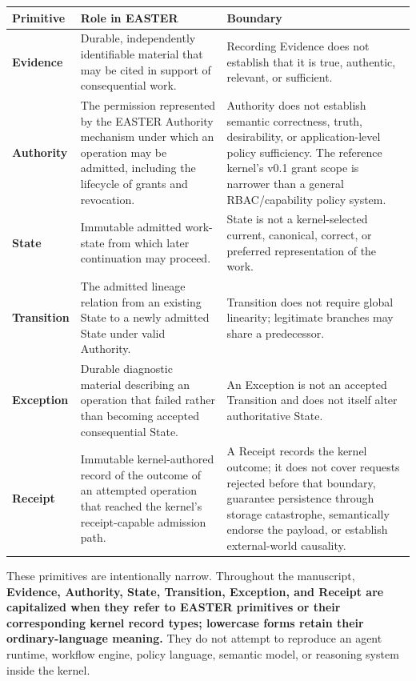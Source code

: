 \documentclass[11pt]{article}
\begin{document}
\begin{table}[htbp]
\centering
\small
\begin{tabularx}{\textwidth}{X X X}
\toprule
Primitive & Role in EASTER & Boundary \\
\midrule
\textbf{Evidence} & Durable, independently identifiable material that may be cited in support of consequential work. & Recording Evidence does not establish that it is true, authentic, relevant, or sufficient. \\
\textbf{Authority} & The permission represented by the EASTER Authority mechanism under which an operation may be admitted, including the lifecycle of grants and revocation. & Authority does not establish semantic correctness, truth, desirability, or application-level policy sufficiency. The reference kernel's v0.1 grant scope is narrower than a general RBAC/capability policy system. \\
\textbf{State} & Immutable admitted work-state from which later continuation may proceed. & State is not a kernel-selected current, canonical, correct, or preferred representation of the work. \\
\textbf{Transition} & The admitted lineage relation from an existing State to a newly admitted State under valid Authority. & Transition does not require global linearity; legitimate branches may share a predecessor. \\
\textbf{Exception} & Durable diagnostic material describing an operation that failed rather than becoming accepted consequential State. & An Exception is not an accepted Transition and does not itself alter authoritative State. \\
\textbf{Receipt} & Immutable kernel-authored record of the outcome of an attempted operation that reached the kernel's receipt-capable admission path. & A Receipt records the kernel outcome; it does not cover requests rejected before that boundary, guarantee persistence through storage catastrophe, semantically endorse the payload, or establish external-world causality. \\
\bottomrule
\end{tabularx}
\end{table}


These primitives are intentionally narrow. Throughout the manuscript, \textbf{Evidence, Authority, State, Transition, Exception, and Receipt are capitalized when they refer to EASTER primitives or their corresponding kernel record types; lowercase forms retain their ordinary-language meaning.} They do not attempt to reproduce an agent runtime, workflow engine, policy language, semantic model, or reasoning system inside the kernel.
\end{document}
